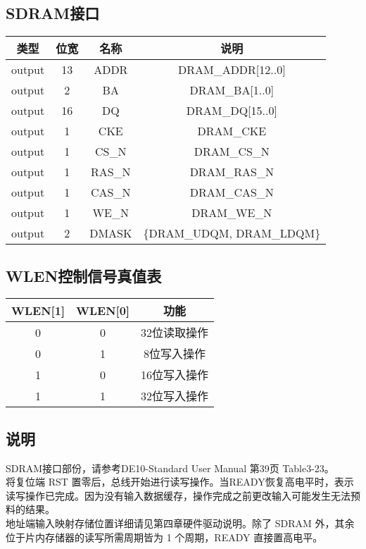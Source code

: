 \subsection{SDRAM接口}
\label{SDRAM-ports}
\begin{tabular}{|c|c|c|c|}
    \hline
    类型        &   位宽    &   名称    &   说明\\\hline
    output      &   13     &    ADDR   &    DRAM\_ADDR[12..0]\\\hline
    output      &   2       &   BA      &   DRAM\_BA[1..0]\\\hline
    output      &   16      &   DQ      &   DRAM\_DQ[15..0]\\\hline
    output      &   1       &   CKE     &   DRAM\_CKE\\\hline
    output      &   1       &   CS\_N     &   DRAM\_CS\_N\\\hline
    output      &   1       &   RAS\_N     &   DRAM\_RAS\_N\\\hline
    output      &   1       &   CAS\_N     &   DRAM\_CAS\_N\\\hline
    output      &   1       &   WE\_N     &   DRAM\_WE\_N\\\hline
    output      &   2       &   DMASK     &  \{DRAM\_UDQM, DRAM\_LDQM\}\\\hline
\end{tabular}
\subsection{WLEN控制信号真值表}
\begin{tabular}{|c|c|c|}
    \hline
    WLEN[1]  &  WLEN[0] &       功能\\\hline
    0       &   0       &       32位读取操作\\\hline
    0       &   1       &       8位写入操作\\\hline
    1       &   0       &       16位写入操作\\\hline
    1       &   1       &       32位写入操作\\\hline
\end{tabular}
\subsection{说明}
SDRAM接口部份，请参考DE10-Standard User Manual 第39页 Table3-23。\\
将复位端 RST 置零后，总线开始进行读写操作。当READY恢复高电平时，表示读写操作已完成。因为没有输入数据缓存，操作完成之前更改输入可能发生无法预料的结果。\\
地址端输入映射存储位置详细请见第四章硬件驱动说明。除了 SDRAM 外，其余位于片内存储器的读写所需周期皆为 1 个周期，READY 直接置高电平。

